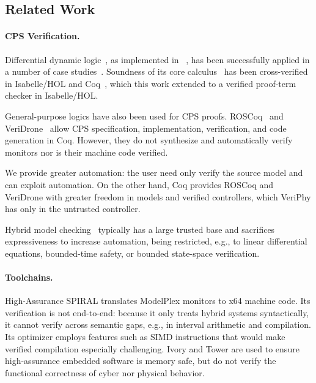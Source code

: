 \documentclass[12pt]{cmuthesis}
\theoremstyle{definition}
\theoremstyle{remark}
\newcommand{\Isabelle}{Isabelle/HOL\xspace}
\newcommand{\VeriPhy}{VeriPhy\xspace}
\begin{document}
\subsection{Related Work}
\paragraph{CPS Verification.}
Differential dynamic logic~\cite{DBLP:journals/jar/Platzer08,DBLP:conf/lics/Platzer12a}, as implemented in \KeYmaeraX~\cite{DBLP:conf/cade/FultonMQVP15}, has been successfully applied in a number of case studies~\cite{DBLP:conf/cade/Platzer16}.
Soundness of its core calculus~\cite{DBLP:journals/jar/Platzer17} has been cross-verified in \Isabelle and Coq~\cite{DBLP:conf/cpp/BohrerRVVP17}, which this work extended to a verified proof-term checker in \Isabelle.

General-purpose logics have also been used for CPS proofs.
ROSCoq~\cite{DBLP:conf/itp/AnandK15} and VeriDrone~\cite{DBLP:conf/cpsweek/MalechaRAL16} allow CPS specification, implementation, verification, and code generation in Coq.
However, they do not synthesize and automatically verify monitors nor is their machine code verified.

We provide greater automation: the user need only verify the source model and can exploit \KeYmaeraX automation.
On the other hand, Coq provides ROSCoq and VeriDrone with greater freedom in models and verified controllers, which \VeriPhy has only in the untrusted controller.

Hybrid model checking~\cite{DBLP:conf/cav/FrehseGDCRLRGDM11,DBLP:conf/cav/ChenAS13,DBLP:conf/tacas/DuggiralaMVP15} typically has a large trusted base and sacrifices expressiveness to increase automation, being restricted, e.g., to linear differential equations, bounded-time safety, or bounded state-space verification.

\paragraph{Toolchains.}
High-Assurance SPIRAL \cite{DBLP:journals/csm/FranchettiLMMGPPKMFJPV17} translates ModelPlex monitors to x64 machine code.
Its verification is not end-to-end: because it only treats hybrid systems syntactically, it cannot verify across semantic gaps, e.g., in interval arithmetic and compilation.
Its optimizer employs features such as SIMD instructions that would make verified compilation especially challenging.
%
Ivory \cite{DBLP:conf/haskell/ElliottPWHBSSL15} and Tower \cite{DBLP:conf/plpv/PikeHBEDL14} are used to ensure high-assurance embedded software is memory safe, but do not verify the functional correctness of cyber nor physical behavior.
\end{document}

